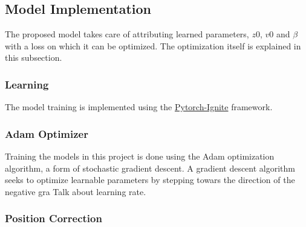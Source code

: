 \subsection{Model Implementation}
\label{sec:Method:ModelImplementation}
The proposed model takes care of attributing learned parameters, $z0$, $v0$ and $\beta$ with a loss on which it can be optimized.
The optimization itself is explained in this subsection.


\subsubsection{Learning}
\label{sec:Method:ModelImplementation:Learning}
The model training is implemented using the \hyperlink{https://pytorch-ignite.ai/}{Pytorch-Ignite} framework.



\subsubsection{Adam Optimizer}
\label{sec:Method:ModelImplementation:Adam}
Training the models in this project is done using the Adam optimization algorithm, a form of stochastic gradient descent.
A gradient descent algorithm seeks to optimize learnable parameters by stepping towars the direction of the negative gra
Talk about learning rate.


\subsubsection{Position Correction}
\label{sec:Method:ModelImplementation:PositionCorrection}




